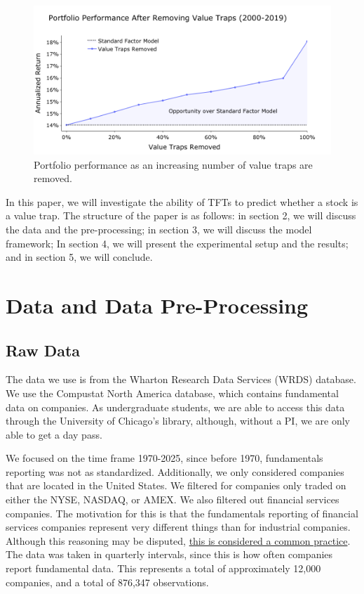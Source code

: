 \documentclass[AER]{AEA}
\begin{document}
\begin{figure}[ht] 
    \includegraphics[scale = 0.3]{value_trap_clairvoyant_2.png}
    \caption{Portfolio performance as an increasing number of value traps are removed.}
    \label{fig:clairvoyant}
\end{figure}

In this paper, we will investigate the ability of TFTs to predict whether a stock is a value trap.
The structure of the paper is as follows: in section 2, we will discuss the data and the pre-processing; 
in section 3, we will discuss the model framework; In section 4, we will present the experimental setup
and the results; and in section 5, we will conclude.
\section{Data and Data Pre-Processing}
\subsection{Raw Data}
The data we use is from the Wharton Research Data Services (WRDS) database.
We use the Compustat North America database, which contains fundamental data on companies.
As undergraduate students, we are able to access this data through the University of Chicago's library,
although, without a PI, we are only able to get a day pass.

We focused on the time frame 1970-2025, since before 1970, fundamentals reporting was not as standardized.
Additionally, we only considered companies that are located in the United States. We filtered for companies
only traded on either the NYSE, NASDAQ, or AMEX. We also filtered out financial services companies. 
The motivation for this is that the fundamentals reporting of financial services companies represent
very different things than for industrial companies. Although this reasoning may be disputed, 
\href{https://alphaarchitect.com/why-exclude-financial-firms-from-quantitative-studies/}{this is considered
a common practice}. The data was taken in quarterly intervals, since this is how often companies report
fundamental data. This represents a total of approximately 12,000 companies, and a total of 876,347 observations.
\end{document}
